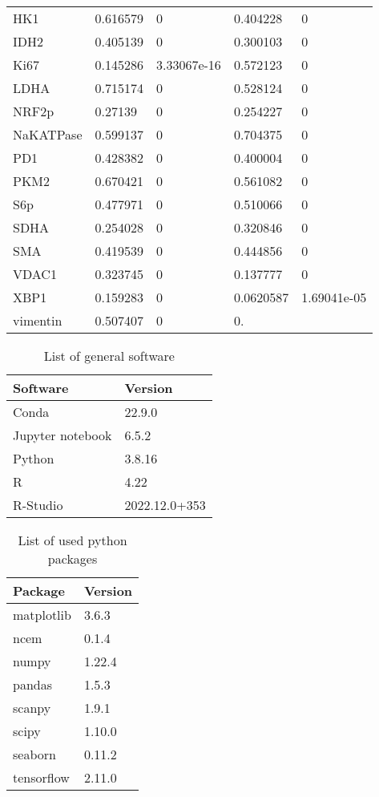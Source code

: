 \begin{table}[!h]
\begin{tabular}{ l p{3cm} p{3cm} p{3cm} p{3cm}}
        HK1 & 0.616579 & 0 & 0.404228 & 0 \\
        IDH2 & 0.405139 & 0 & 0.300103 & 0 \\
        Ki67 & 0.145286 & 3.33067e-16 & 0.572123 & 0 \\
        LDHA & 0.715174 & 0 & 0.528124 & 0 \\
        NRF2p & 0.27139 & 0 & 0.254227 & 0 \\
        NaKATPase & 0.599137 & 0 & 0.704375 & 0 \\
        PD1 & 0.428382 & 0 & 0.400004 & 0 \\
        PKM2 & 0.670421 & 0 & 0.561082 & 0 \\
        S6p & 0.477971 & 0 & 0.510066 & 0 \\
        SDHA & 0.254028 & 0 & 0.320846 & 0 \\
        SMA & 0.419539 & 0 & 0.444856 & 0 \\
        VDAC1 & 0.323745 & 0 & 0.137777 & 0 \\
        XBP1 & 0.159283 & 0 & 0.0620587 & 1.69041e-05 \\
        vimentin & 0.507407 & 0 & 0. & ~ \\
    \end{tabular}
    \label{tab:sup-moran}
\end{table}


\begin{table}[!h]
    \centering
    \caption{List of general software}
    \begin{tabular}{ll}
    \hline
        \textbf{Software} & \textbf{Version} \\
        \hline
        Conda & 22.9.0 \\
        Jupyter notebook & 6.5.2 \\
        Python & 3.8.16 \\
        R & 4.22 \\
        R-Studio & 2022.12.0+353 \\
    \end{tabular}
    \label{tab:software}
\end{table}


\begin{table}[!h]
    \centering
    \caption{List of used python packages}
    \begin{tabular}{ll}
        \hline
        \textbf{Package} & \textbf{Version} \\ 
        \hline
        matplotlib & 3.6.3 \\ 
        ncem & 0.1.4 \\ 
        numpy & 1.22.4 \\ 
        pandas & 1.5.3 \\ 
        scanpy & 1.9.1 \\ 
        scipy & 1.10.0 \\ 
        seaborn & 0.11.2 \\ 
        tensorflow & 2.11.0 \\ 
    \end{tabular}
    \label{tab:python}
\end{table}


